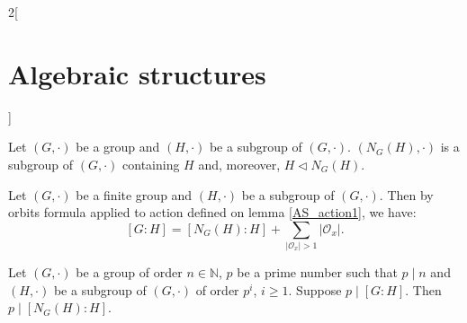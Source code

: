 \documentclass[class=article,10pt,crop=false]{standalone}
\begin{document}
\begin{multicols}{2}[\section{Algebraic structures}]
\begin{definition}
\end{definition}
\begin{lemma}
Let $(G,\cdot)$ be a group and $(H,\cdot)$ be a subgroup of $(G,\cdot)$. $(N_G(H),\cdot)$ is a subgroup of $(G,\cdot)$ containing $H$ and, moreover, $H\lhd N_G(H)$.
\end{lemma}
\begin{corollary}
Let $(G,\cdot)$ be a finite group and $(H,\cdot)$ be a subgroup of $(G,\cdot)$. Then by orbits formula applied to action defined on lemma \ref{AS_action1}, we have: $$[G:H]=[N_G(H):H]+\sum_{|\mathcal{O}_x|>1}|\mathcal{O}_x|.$$
\end{corollary}
\begin{prop}
Let $(G,\cdot)$ be a group of order $n\in\mathbb{N}$, $p$ be a prime number such that $p\mid n$ and $(H,\cdot)$ be a subgroup of $(G,\cdot)$ of order $p^i$, $i\geq 1$. Suppose $p\mid[G:H]$. Then $p\mid[N_G(H):H]$.
\end{prop}

\end{multicols}
\end{document}
